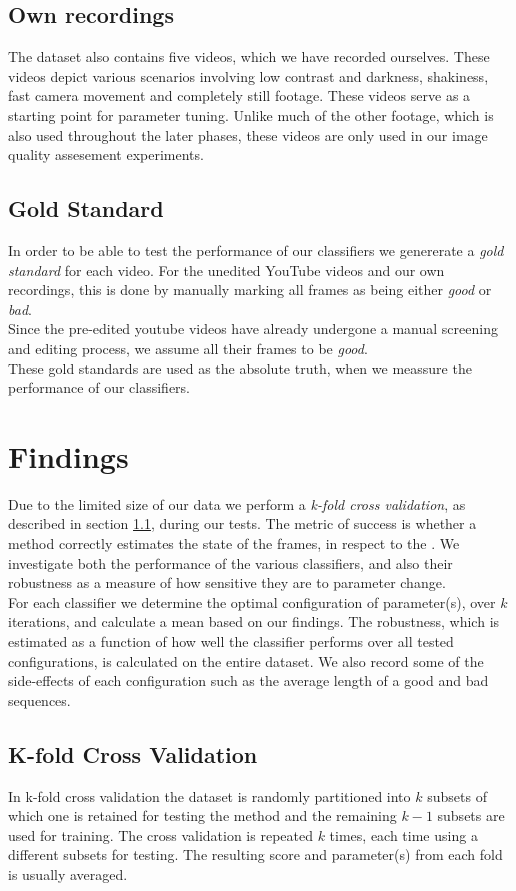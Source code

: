 \subsection{Own recordings}
%
The dataset also contains five videos, which we have recorded ourselves. These videos depict various scenarios involving low contrast and darkness, shakiness, fast camera movement and completely still footage. These videos serve as a starting point for parameter tuning. Unlike much of the other footage, which is also used throughout the later phases, these videos are only used in our image quality assesement experiments.
%
%
\subsection{Gold Standard}\label{sec:goldstandard}
%
In order to be able to test the performance of our classifiers we genererate a \textit{gold standard} for each video. For the unedited YouTube videos and our own recordings, this is done by manually marking all frames as being either \textit{good} or \textit{bad}.\\
Since the pre-edited youtube videos have already undergone a manual screening and editing process, we assume all their frames to be \textit{good}.\\
These gold standards are used as the absolute truth, when we meassure the performance of our classifiers.
%
\section{Findings}
%
Due to the limited size of our data we perform a \emph{k-fold cross validation}, as described in section \ref{sec:kfoldxval}, during our tests. The metric of success is whether a method correctly estimates the state of the frames, in respect to the . We investigate both the performance of the various classifiers, and also their robustness as a measure of how sensitive they are to parameter change.\\
For each classifier we determine the optimal configuration of parameter(s), over $k$ iterations, and calculate a mean based on our findings. The robustness, which is estimated as a function of how well the classifier performs over all tested configurations, is calculated on the entire dataset. We also record some of the side-effects of each configuration such as the average length of a good and bad sequences.\\
%
\subsection{K-fold Cross Validation}\label{sec:kfoldxval}
%
 In k-fold cross validation the dataset is randomly partitioned into $k$ subsets of which one is retained for testing the method and the remaining $k-1$ subsets are used for training. The cross validation is repeated $k$ times, each time using a different subsets for testing. The resulting score and parameter(s) from each fold is usually averaged.
%
